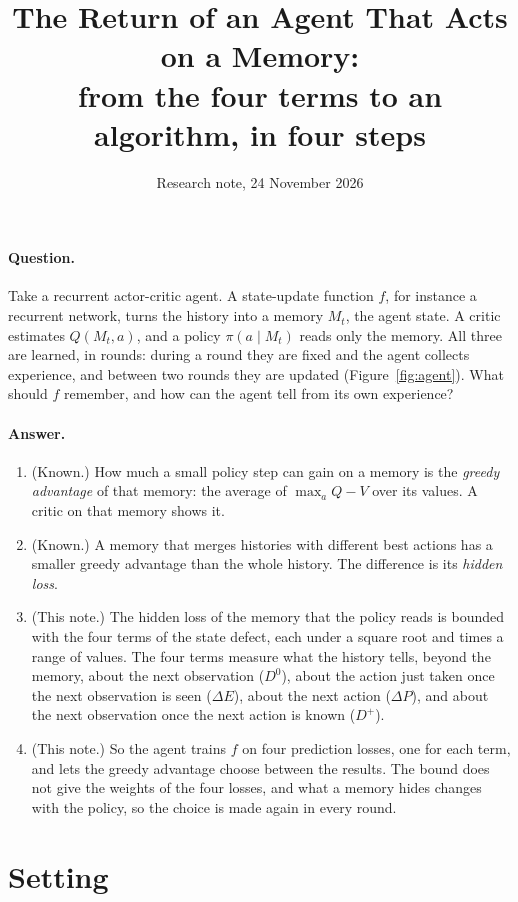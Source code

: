 \documentclass[11pt]{article}
\title{The Return of an Agent That Acts on a Memory:\\ from the four terms to an algorithm, in four steps}
\author{}
\date{Research note, 24 November 2026}
\theoremstyle{definition}
\newcommand{\dE}{\Delta E}
\newcommand{\dP}{\Delta P}
\begin{document}
\maketitle

\paragraph{Question.} Take a recurrent actor-critic agent. A state-update function $f$, for instance a recurrent network, turns the history into a memory $M_t$, the agent state. A critic estimates $Q(M_t,a)$, and a policy $\pi(a\mid M_t)$ reads only the memory. All three are learned, in rounds: during a round they are fixed and the agent collects experience, and between two rounds they are updated (Figure~\ref{fig:agent}). What should $f$ remember, and how can the agent tell from its own experience?

\paragraph{Answer.}
\begin{enumerate}
\item (Known.) How much a small policy step can gain on a memory is the \emph{greedy advantage} of that memory: the average of $\max_aQ-V$ over its values. A critic on that memory shows it.
\item (Known.) A memory that merges histories with different best actions has a smaller greedy advantage than the whole history. The difference is its \emph{hidden loss}.
\item (This note.) The hidden loss of the memory that the policy reads is bounded with the four terms of the state defect, each under a square root and times a range of values. The four terms measure what the history tells, beyond the memory, about the next observation ($D^0$), about the action just taken once the next observation is seen ($\dE$), about the next action ($\dP$), and about the next observation once the next action is known ($D^+$).
\item (This note.) So the agent trains $f$ on four prediction losses, one for each term, and lets the greedy advantage choose between the results. The bound does not give the weights of the four losses, and what a memory hides changes with the policy, so the choice is made again in every round.
\end{enumerate}

\section{Setting}
\end{document}
